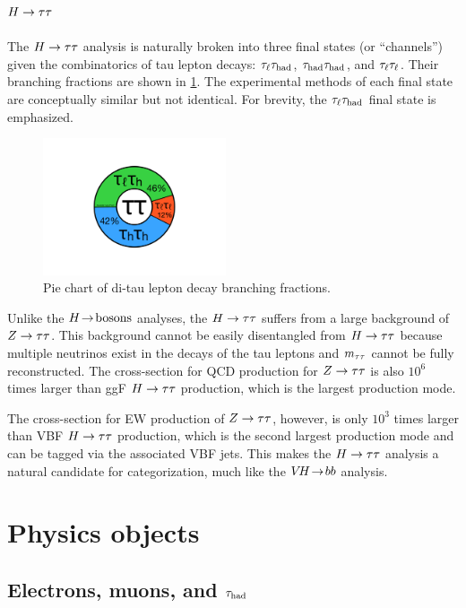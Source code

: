\subsection{$H\rightarrow\tau\tau$}
\label{sec:strategy-htautau}

The $H\rightarrow\tau\tau$ analysis is naturally broken into three final states (or ``channels'') given the combinatorics of tau lepton decays: $\tau_\ell\tau_\text{had}$, $\tau_\text{had}\tau_\text{had}$, and $\tau_\ell\tau_\ell$. Their branching fractions are shown in \cref{fig:strategy-decaypie}. The experimental methods of each final state are conceptually similar but not identical. For brevity, the $\tau_\ell\tau_\text{had}$ final state is emphasized.

\begin{figure}[tp]
  \centering
  \includegraphics[width=0.48\textwidth]{figures/piecharts/tautaudecay}
  \caption{Pie chart of di-tau lepton decay branching fractions.}
  \label{fig:strategy-decaypie}
\end{figure}

Unlike the $H \!\rightarrow\! \text{bosons}$ analyses, the $H\rightarrow\tau\tau$ suffers from a large background of $Z\rightarrow\tau\tau$. This background cannot be easily disentangled from $H\rightarrow\tau\tau$ because multiple neutrinos exist in the decays of the tau leptons and $m_{\tau\tau}$ cannot be fully reconstructed. The cross-section for QCD production for $Z\rightarrow\tau\tau$ is also $10^6$ times larger than ggF $H\rightarrow\tau\tau$ production, which is the largest production mode.

The cross-section for EW production of $Z\rightarrow\tau\tau$, however, is only $10^3$ times larger than VBF $H\rightarrow\tau\tau$ production, which is the second largest production mode and can be tagged via the associated VBF jets. This makes the $H\rightarrow\tau\tau$ analysis a natural candidate for categorization, much like the $V\!H \!\rightarrow\! bb$ analysis.

\section{Physics objects}
\label{sec:strategy-objects}

\subsection{Electrons, muons, and $\tau_\text{had}$}
\label{sec:strategy-leptons}

